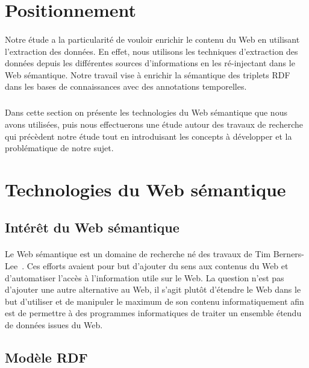 \documentclass[12pt,a4]{report}
\begin{document}
\section{Positionnement}
\paragraph{}
Notre étude a la particularité de vouloir enrichir le contenu du Web en utilisant l'extraction des données. 
En effet, nous utilisons les techniques d'extraction des données depuis les différentes sources d'informations en les ré-injectant dans le Web sémantique. Notre travail vise à enrichir la sémantique des triplets RDF dans les bases de connaissances avec des annotations temporelles.
\subparagraph{}
Dans cette section on présente les technologies du Web sémantique que nous avons utilisées, puis nous effectuerons une étude autour des travaux de recherche qui précèdent notre étude tout en introduisant les concepts à développer et la problématique de notre sujet.
\section{Technologies du Web sémantique}
\subsection{Intérêt du Web sémantique}
\paragraph{}
Le Web sémantique est un domaine de recherche né des travaux de Tim Berners-Lee~\cite{Berners-lee2001}. Ces efforts avaient pour but d'ajouter du sens aux contenus du Web et d'automatiser l'accès à l'information utile sur le Web. La question n’est pas d'ajouter une autre alternative au Web, il s’agit plutôt d'étendre le Web dans le but d'utiliser et de manipuler le maximum de son contenu informatiquement afin est de permettre à des programmes informatiques de traiter un ensemble étendu de données issues du Web.
\subsection{Modèle RDF}
\end{document}
